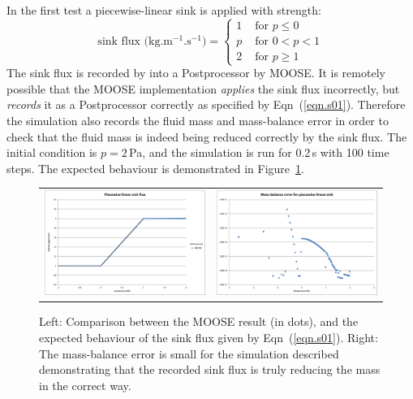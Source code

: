 \documentclass[]{scrreprt}
\begin{document}
\noindent In the first test a piecewise-linear sink is applied with strength:
\begin{equation}
\mbox{sink flux (kg.m$^{-1}$.s$^{-1}$)} = \left\{
\begin{array}{ll}
1 & \mbox{ for } p \leq 0 \\
p & \mbox{ for } 0<p<1 \\
2 & \mbox{ for } p\geq 1 
\end{array}
\right.
\label{eqn.s01}
\end{equation}
The sink flux is recorded by into a Postprocessor by MOOSE.  It is
remotely possible that the MOOSE implementation {\em applies} the sink
flux incorrectly, but {\em records} it as a Postprocessor correctly as
specified by Eqn~(\ref{eqn.s01}).  Therefore the simulation also
records the fluid mass and mass-balance error in order to check that
the fluid mass is indeed being reduced correctly by the sink flux.
The initial condition is $p=2$\,Pa, and the simulation is run for
0.2\,s with 100 time steps.  The expected behaviour is demonstrated in
Figure~\ref{s01.fig}.

\begin{figure}[htb]
\centering
\begin{tabular}{cc}
\includegraphics[width=7cm]{s01.eps} &
\includegraphics[width=7cm]{s01_mass_bal.eps}
\end{tabular}
\caption{Left: Comparison between the MOOSE result (in dots), and the
  expected behaviour of the sink flux given by Eqn~(\ref{eqn.s01}).
  Right: The mass-balance error is small for the simulation described
  demonstrating that the recorded sink flux is truly reducing the mass
  in the correct way.}
\label{s01.fig}
\end{figure}
\end{document}
